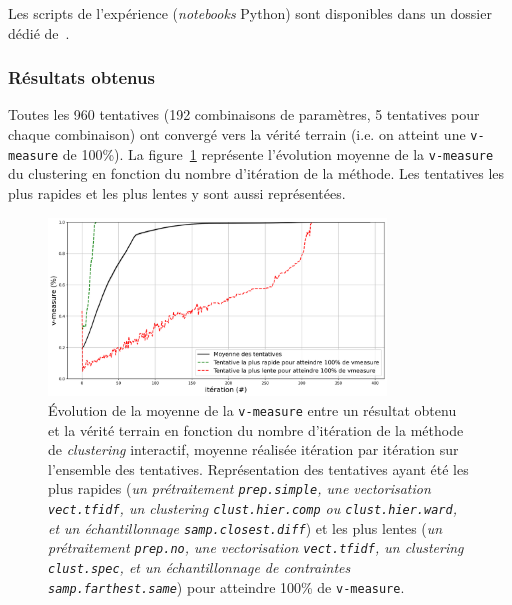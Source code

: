 				Les scripts de l'expérience (\textit{notebooks} Python) sont disponibles dans un dossier dédié de~\cite{schild:cognitivefactory-interactive-clustering-comparative-study:2021}.

			\subsubsection{Résultats obtenus}
				
				Toutes les 960 tentatives (192 combinaisons de paramètres, 5 tentatives pour chaque combinaison) ont convergé vers la vérité terrain (i.e. on atteint une \texttt{v-measure} de 100\%).
				La figure~\ref{figure:4.1.1-ETUDE-CONVERGENCE-EVOLUTION} représente l'évolution moyenne de la \texttt{v-measure} du clustering en fonction du nombre d'itération de la méthode. Les tentatives les plus rapides et les plus lentes y sont aussi représentées.
				\begin{figure}[H]
					\centering
					\includegraphics[width=0.8\textwidth]{figures/etude-convergence-evolution-moyenne-0par-iteration}
					\caption{Évolution de la moyenne de la \texttt{v-measure} entre un résultat obtenu et la vérité terrain en fonction du nombre d'itération de la méthode de \textit{clustering} interactif, moyenne réalisée itération par itération sur l'ensemble des tentatives.
					Représentation des tentatives ayant été les plus rapides (\textit{un prétraitement \texttt{prep.simple}, une vectorisation \texttt{vect.tfidf}, un clustering \texttt{clust.hier.comp} ou \texttt{clust.hier.ward}, et un échantillonnage \texttt{samp.closest.diff}}) et les plus lentes (\textit{un prétraitement \texttt{prep.no}, une vectorisation \texttt{vect.tfidf}, un clustering \texttt{clust.spec}, et un échantillonnage de contraintes \texttt{samp.farthest.same}}) pour atteindre 100\% de \texttt{v-measure}.}
					\label{figure:4.1.1-ETUDE-CONVERGENCE-EVOLUTION}
				\end{figure}
				
